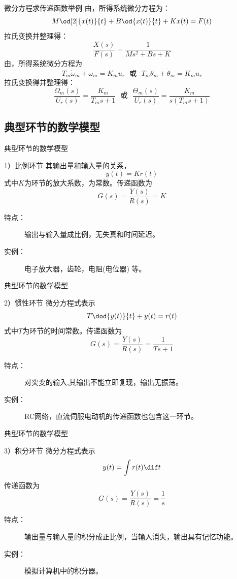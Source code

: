 \documentclass[handout,cjkutf8,table,aspectratio=1610]{beamer} %
\begin{document}
\begin{frame}{微分方程求传递函数举例}
由，所得系统微分方程为：
$$M\od[2]{x(t)}{t}+B\od{x(t)}{t}+Kx(t)=F(t)$$
拉氏变换并整理得：
$$\frac{X(s)}{F(s)}=\frac{1}{Ms^2+Bs+K}$$
由，所得系统微分方程为
$$T_m\dot{\omega}_m+\omega_m=K_mu_r\text{~~或~~}T_m\ddot{\theta}_m+\dot{\theta}_m=K_mu_r$$
拉氏变换得并整理得：
$$\frac{\Omega_m(s)}{U_r(s)}=\frac{K_m}{T_ms+1}\text{~~或~~}\frac{\Theta_m(s)}{U_r(s)}=\frac{K_m}{s(T_ms+1)}$$
\end{frame}

\subsection{典型环节的数学模型}
\begin{frame}{典型环节的数学模型}
\begin{block}{1）比例环节}
其输出量和输入量的关系，
$$y(t)=Kr(t)$$
式中$K$为环节的放大系数，为常数。传递函数为
$$G(s)=\frac{Y(s)}{R(s)}=K$$
\begin{description}
\item[特点：]输出与输入量成比例，无失真和时间延迟。
\item[实例：]电子放大器，齿轮，电阻(电位器) 等。
\end{description}
\end{block}
\end{frame}

\begin{frame}{典型环节的数学模型}
\begin{block}{2）惯性环节}
微分方程式表示
$$T\dod{y(t)}{t}+y(t)=r(t)$$
式中$T$为环节的时间常数。传递函数为
$$G(s)=\frac{Y(s)}{R(s)}=\frac{1}{Ts+1}$$
\begin{description}
\item[特点：]对突变的输入,其输出不能立即复现，输出无振荡。
\item[实例：]RC网络，直流伺服电动机的传递函数也包含这一环节。
\end{description}
\end{block}
\end{frame}

\begin{frame}{典型环节的数学模型}
\begin{block}{3）积分环节}
微分方程式表示
$$y(t)=\int r(t)\dif t$$
传递函数为
$$G(s)=\frac{Y(s)}{R(s)}=\frac{1}{s}$$
\begin{description}
\item[特点：]输出量与输入量的积分成正比例，当输入消失，输出具有记忆功能。
\item[实例：]模拟计算机中的积分器。
\end{description}
\end{block}
\end{frame}
\end{document}
